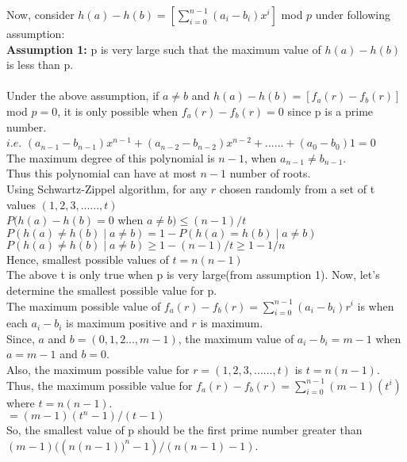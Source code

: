 \documentclass[11pt]{article}
\begin{document}
	Now, consider $h(a) - h(b) = [\sum_{i=0}^{n-1} (a_i-b_i) x^i]$ mod $p$ under following assumption: \\
	\textbf{Assumption 1:} p  is very large such that the maximum value of $h(a) - h(b)$ is less than p.\\
	\\
	Under the above assumption, if $ a \neq b$ and $h(a) - h(b) = [f_a(r) - f_b(r)]$ mod $p= 0$, it is only possible when
	$f_a(r) - f_b(r) = 0$ since p is a prime number. \\
	$i.e.$ $(a_{n-1} - b_{n-1}) x^{n-1} + (a_{n-2} - b_{n-2}) x^{n-2} + ......+ (a_0 - b_0)1 = 0$ \\
	The maximum degree of this polynomial is $n-1$, when $a_{n-1} \neq b_{n-1}$.\\
	Thus this polynomial can have at most $n-1$ number of roots. \\
	Using Schwartz-Zippel algorithm, for any $r$ chosen randomly from a set of t values $(1,2,3,......,t)$ \\
	$P(h(a) - h(b) = 0$ when $a \neq b) \leq (n-1)/t$ \\
	$P(h(a) \neq h(b) \mid a \neq b) = 1 - P(h(a) = h(b) \mid a \neq b)$ \\
	$P(h(a) \neq h(b) \mid a \neq b) \geq 1- (n-1)/t  \geq 1 - 1/n$ \\
	Hence, smallest possible values of $t = n(n-1)$ \\
	
	The above t is only true when p is very large(from assumption 1). Now, let's determine the smallest possible value for p.\\
	The maximum possible value of $f_a(r) - f_b(r) = \sum_{i=0}^{n-1} (a_i-b_i) r^i$ is when each $a_i - b_i$ is maximum positive and
	$r$ is maximum. \\
	Since, $a$ and $b = (0,1,2...,m-1)$, the maximum value of $a_i - b_i = m-1$ when $a = m-1$ and $b= 0$.\\
	Also, the maximum possible value for $r = (1,2,3,......,t)$ is $t = n(n-1)$. \\
	Thus, the maximum possible value for  $f_a(r) - f_b(r) = \sum_{i=0}^{n-1} (m-1)(t^i)$ where $t = n(n-1)$.\\
	$ = (m-1)(t^n - 1)/(t-1)$ \\
	So, the smallest value of p should be the first prime number greater than\\ $(m-1)(({n(n-1))}^n - 1)/(n(n-1)-1)$.
	
\end{document}
